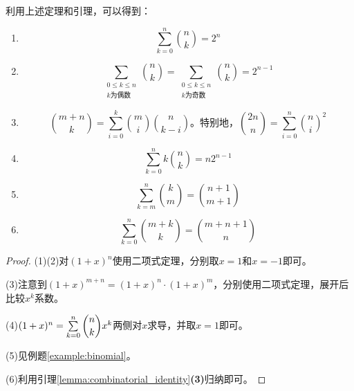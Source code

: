             \begin{corollary}
                利用上述定理和引理，可以得到：
                \begin{enumerate}
                    \item
                        \begin{equation*}
                            \sum_{k=0}^{n}\binom{n}{k}=2^{n}
                        \end{equation*}
                    \item
                        \begin{equation*}
                            \sum_{\substack{0\leq k\leq n \\ k\text{为偶数}}}\binom{n}{k}=\sum_{\substack{0\leq k\leq n \\ k\text{为奇数}}}\binom{n}{k}=2^{n-1}
                        \end{equation*}
                    \item
                        \begin{equation*}
                            \binom{m+n}{k}=\sum_{i=0}^{k}\binom{m}{i}\binom{n}{k-i}\text{。特别地，}\binom{2n}{n}=\sum_{i=0}^{n}\binom{n}{i}^{2}
                        \end{equation*}
                    \item
                        \begin{equation*}
                            \sum_{k=0}^{n}k\binom{n}{k}=n2^{n-1}
                        \end{equation*}
                    \item
                        \begin{equation*}
                            \sum_{k=m}^{n}\binom{k}{m}=\binom{n+1}{m+1}
                        \end{equation*}
                    \item
                        \begin{equation*}
                            \sum_{k=0}^{n}\binom{m+k}{k}=\binom{m+n+1}{n}
                        \end{equation*}
                \end{enumerate}
            \end{corollary}

            \begin{proof}
                (1)(2)对$(1+x)^n$使用二项式定理，分别取$x=1$和$x=-1$即可。

                (3)注意到$(1+x)^{m+n}=(1+x)^n\cdot(1+x)^m$，分别使用二项式定理，展开后比较$x^{k}$系数。

                (4)$(1+x)^n=\sum\limits_{k=0}^{n}\dbinom{n}{k}x^{k}$两侧对$x$求导，并取$x=1$即可。

                (5)见例题\ref{example:binomial}。

                (6)利用引理\ref{lemma:combinatorial_identity}\textbf{(3)}归纳即可。
            \end{proof}


